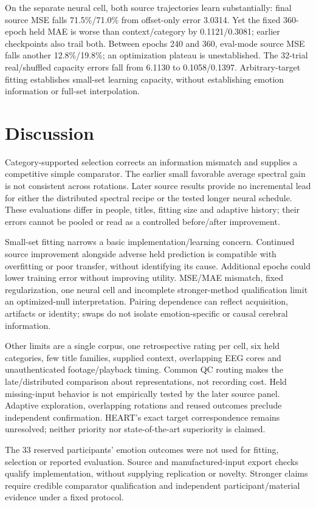 \documentclass[10pt,letterpaper]{article}
\begin{document}
On the separate neural cell, both source trajectories learn substantially: final source MSE falls 71.5\%/71.0\% from offset-only error 3.0314. Yet the fixed 360-epoch held MAE is worse than context/category by 0.1121/0.3081; earlier checkpoints also trail both. Between epochs 240 and 360, eval-mode source MSE falls another 12.8\%/19.8\%; an optimization plateau is unestablished. The 32-trial real/shuffled capacity errors fall from 6.1130 to 0.1058/0.1397. Arbitrary-target fitting establishes small-set learning capacity, without establishing emotion information or full-set interpolation.

\section{Discussion}
Category-supported selection corrects an information mismatch and supplies a competitive simple comparator. The earlier small favorable average spectral gain is not consistent across rotations. Later source results provide no incremental lead for either the distributed spectral recipe or the tested longer neural schedule. These evaluations differ in people, titles, fitting size and adaptive history; their errors cannot be pooled or read as a controlled before/after improvement.

Small-set fitting narrows a basic implementation/learning concern. Continued source improvement alongside adverse held prediction is compatible with overfitting or poor transfer, without identifying its cause. Additional epochs could lower training error without improving utility. MSE/MAE mismatch, fixed regularization, one neural cell and incomplete stronger-method qualification limit an optimized-null interpretation. Pairing dependence can reflect acquisition, artifacts or identity; swaps do not isolate emotion-specific or causal cerebral information.

Other limits are a single corpus, one retrospective rating per cell, six held categories, few title families, supplied context, overlapping EEG cores and unauthenticated footage/playback timing. Common QC routing makes the late/distributed comparison about representations, not recording cost. Held missing-input behavior is not empirically tested by the later source panel. Adaptive exploration, overlapping rotations and reused outcomes preclude independent confirmation. HEART's exact target correspondence remains unresolved; neither priority nor state-of-the-art superiority is claimed.

The 33 reserved participants' emotion outcomes were not used for fitting, selection or reported evaluation. Source and manufactured-input export checks qualify implementation, without supplying replication or novelty. Stronger claims require credible comparator qualification and independent participant/material evidence under a fixed protocol.
\end{document}
